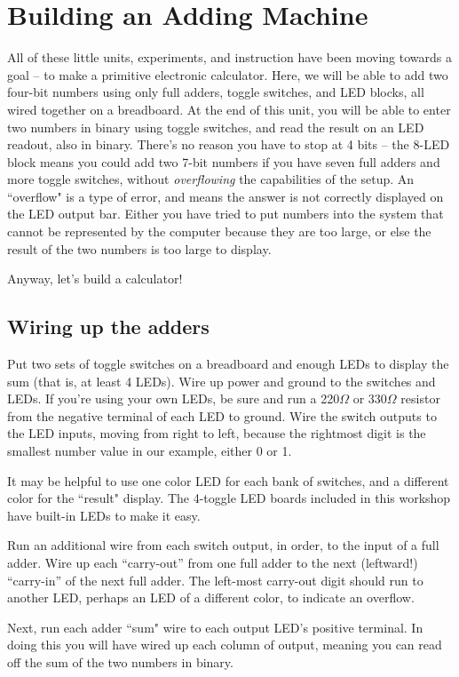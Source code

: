 \section{Building an Adding Machine}
All of these little units, experiments, and instruction have been moving towards a goal -- to make a primitive electronic calculator. Here, we will be able to add two four-bit numbers using only full adders, toggle switches, and LED blocks, all wired together on a breadboard. At the end of this unit, you will be able to enter two numbers in binary using toggle switches, and read the result on an LED readout, also in binary. There's no reason you have to stop at 4 bits -- the 8-LED block means you could add two 7-bit numbers if you have seven full adders and more toggle switches, without \emph{overflowing} the capabilities of the setup. An ``overflow" is a type of error, and means the answer is not correctly displayed on the LED output bar. Either you have tried to put numbers into the system that cannot be represented by the computer because they are too large, or else the result of the two numbers is too large to display.

Anyway, let's build a calculator!

\subsection*{Wiring up the adders}

Put two sets of toggle switches on a breadboard and enough LEDs to display the sum (that is, at least 4 LEDs). Wire up power and ground to the switches and LEDs. If you're using your own LEDs, be sure and run a 220$\Omega$ or 330$\Omega$ resistor from the negative terminal of each LED to ground. Wire the switch outputs to the LED inputs, moving from right to left, because the rightmost digit is the smallest number value in our example, either 0 or 1.

It may be helpful to use one color LED for each bank of switches, and a different color for the ``result" display. The 4-toggle LED boards included in this workshop have built-in LEDs to make it easy.

Run an additional wire from each switch output, in order, to the input of a full adder. Wire up each ``carry-out'' from one full adder to the next (leftward!) ``carry-in'' of the next full adder. The left-most carry-out digit should run to another LED, perhaps an LED of a different color, to indicate an overflow.

Next, run each adder ``sum" wire to each output LED's positive terminal. In doing this you will have wired up each column of output, meaning you can read off the sum of the two numbers in binary.


